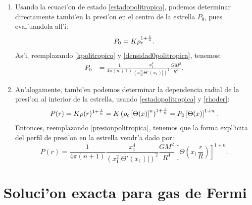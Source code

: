 \begin{enumerate}
\item Usando la ecuaci'on de estado \eqref{estadopolitropica}, podemos determinar directamente tambi'en la presi'on en el centro de la estrella $P_0$, pues eval'uandola all'i:
\begin{equation}
 P_0=K\rho_{\rm c}^{1+\frac{1}{n}}.
\end{equation}
As'i, reemplazando \eqref{kpolitropico} y \eqref{densidad0politropica}, tenemos:
\begin{align}
P_0&=\frac{1}{4\pi(n+1)}\frac{x_1^4}{\left(x_1^2\left|\Theta'(x_1)\right|\right)^2}\frac{GM^2}{R^4}\label{presionpolitropica}.
\end{align}
\item An'alogamente, tambi'en podemos determinar la dependencia radial de la presi'on al interior de la estrella, usando \eqref{estadopolitropica} y \eqref{rhoder}:
\begin{align}
 P(r)=K\rho(r)^{1+\frac{1}{n}}=K\left(\rho_{\rm c}\left[\Theta(x)\right]^n\right)^{1+\frac{1}{n}}=P_0\left[\Theta(x)\right]^{1+n}.
\end{align}
Entonces, reemplazando \eqref{presionpolitropica}, tenemos que la forma expl'icita del perfil de presi'on en la estrella vendr'a dado por:
\begin{equation}
 P(r)=\frac{1}{4\pi(n+1)}\frac{x_1^4}{\left(x_1^2\left|\Theta'(x_1)\right|\right)^2}\frac{GM^2}{R^4}\left[\Theta\left( x_1\frac{r}{R}\right)\right]^{1+n}.
\end{equation}






\end{enumerate}

\section{Soluci'on exacta para gas de Fermi}\label{sec:fermi-exacta}

